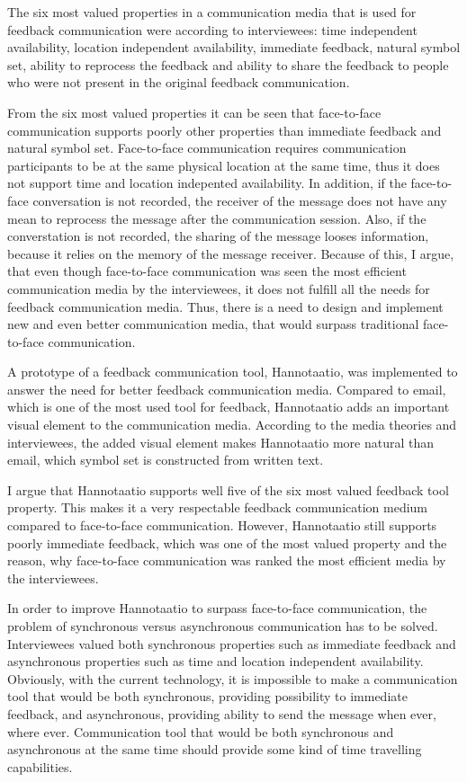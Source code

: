 \documentclass[english,12pt,a4paper,pdftex]{article}
\begin{document}
The six most valued properties in a communication media that is used for feedback communication were according to interviewees: time independent availability, location independent availability, immediate feedback, natural symbol set, ability to reprocess the feedback and ability to share the feedback to people who were not present in the original feedback communication.

From the six most valued properties it can be seen that face-to-face communication supports poorly other properties than immediate feedback and natural symbol set. Face-to-face communication requires communication participants to be at the same physical location at the same time, thus it does not support time and location indepented availability. In addition, if the face-to-face conversation is not recorded, the receiver of the message does not have any mean to reprocess the message after the communication session. Also, if the converstation is not recorded, the sharing of the message looses information, because it relies on the memory of the message receiver. Because of this, I argue, that even though face-to-face communication was seen the most efficient communication media by the interviewees, it does not fulfill all the needs for feedback communication media. Thus, there is a need to design and implement new and even better communication media, that would surpass traditional face-to-face communication.

A prototype of a feedback communication tool, Hannotaatio, was implemented to answer the need for better feedback communication media. Compared to email, which is one of the most used tool for feedback, Hannotaatio adds an important visual element to the communication media. According to the media theories and interviewees, the added visual element makes Hannotaatio more natural than email, which symbol set is constructed from written text. 

I argue that Hannotaatio supports well five of the six most valued feedback tool property. This makes it a very respectable feedback communication medium compared to face-to-face communication. However, Hannotaatio still supports poorly immediate feedback, which was one of the most valued property and the reason, why face-to-face communication was ranked the most efficient media by the interviewees.

In order to improve Hannotaatio to surpass face-to-face communication, the problem of synchronous versus asynchronous communication has to be solved. Interviewees valued both synchronous properties such as immediate feedback and asynchronous properties such as time and location independent availability. Obviously, with the current technology, it is impossible to make a communication tool that would be both synchronous, providing possibility to immediate feedback, and asynchronous, providing ability to send the message when ever, where ever. Communication tool that would be both synchronous and asynchronous at the same time should provide some kind of time travelling capabilities.
\end{document}
